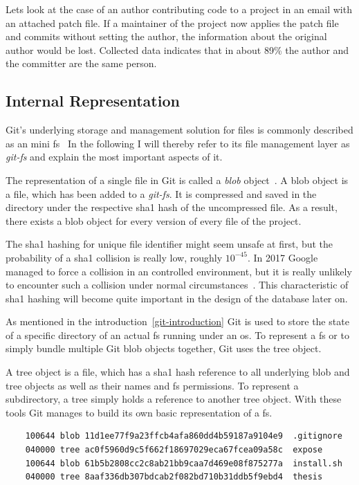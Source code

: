 Lets look at the case of an author contributing code to a project in an email with an attached patch file.
If a maintainer of the project now applies the patch file and commits without setting the author, the information about the original author would be lost.
Collected data indicates that in about 89\% the author and the committer are the same person.


\subsection{Internal Representation}
Git's underlying storage and management solution for files is commonly described as an mini \ac{fs}~\cite[p.~9]{book:pro-git}
In the following I will thereby refer to its file management layer as \emph{git-fs} and explain the most important aspects of it.

The representation of a single file in Git is called a \emph{blob} object~\cite[p.~56]{book:pro-git}.
A blob object is a file, which has been added to a \emph{git-fs}.
It is compressed and saved in the  directory under the respective \ac{sha1} hash of the uncompressed file.
As a result, there exists a blob object for every version of every file of the project.

The \ac{sha1} hashing for unique file identifier might seem unsafe at first, but the probability of a \ac{sha1} collision is really low, roughly $10^{-45}$.
In 2017 Google managed to force a collision in an controlled environment, but it is really unlikely to encounter such a collision under normal circumstances~\cite{techreport:sha-collision}.
This characteristic of \ac{sha1} hashing will become quite important in the design of the database later on.

As mentioned in the introduction~\ref{git-introduction} Git is used to store the state of a specific directory of an actual \ac{fs} running under an \ac{os}.
To represent a \ac{fs} or to simply bundle multiple Git blob objects together, Git uses the tree object.

A tree object is a file, which has a \ac{sha1} hash reference to all underlying blob and tree objects as well as their names and \ac{fs} permissions.
To represent a subdirectory, a tree simply holds a reference to another tree object.
With these tools Git manages to build its own basic representation of a \ac{fs}.

\begin{verbatim}
    100644 blob 11d1ee77f9a23ffcb4afa860dd4b59187a9104e9  .gitignore
    040000 tree ac0f5960d9c5f662f18697029eca67fcea09a58c  expose
    100644 blob 61b5b2808cc2c8ab21bb9caa7d469e08f875277a  install.sh
    040000 tree 8aaf336db307bdcab2f082bd710b31ddb5f9ebd4  thesis
\end{verbatim}
\begingroup
{}
\endgroup

